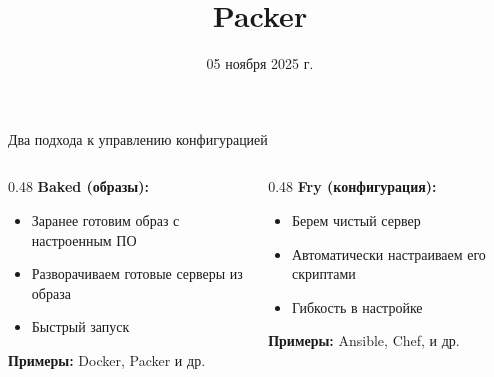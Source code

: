 \documentclass[aspectratio=169]{beamer}
\title{Packer}
\date{05 ноября 2025 г. }
\begin{document}
    \maketitle

    \begin{frame}{Два подхода к управлению конфигурацией}
        \begin{columns}[t]
            \begin{column}[t]{0.48\textwidth}
                \textbf{Baked (образы):}
                \begin{itemize}
                    \item Заранее готовим образ с настроенным ПО
                    \item Разворачиваем готовые серверы из образа
                    \item Быстрый запуск
                \end{itemize}
                
                \vspace{0.3cm}
                \textbf{Примеры:} Docker, Packer и др.
            \end{column}
            
            \begin{column}[t]{0.48\textwidth}
                \textbf{Fry (конфигурация):}
                \begin{itemize}
                    \item Берем чистый сервер
                    \item Автоматически настраиваем его скриптами
                    \item Гибкость в настройке
                \end{itemize}
                
                \vspace{0.3cm}
                \textbf{Примеры:} Ansible, Chef, и др.
            \end{column}
        \end{columns}
        
    \end{frame}
\end{document}

